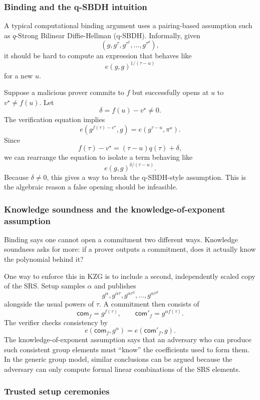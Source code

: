 \documentclass[11pt]{article}
\begin{document}
\subsubsection{Binding and the q-SBDH intuition}

A typical computational binding argument uses a pairing-based assumption such as $q$-Strong Bilinear Diffie-Hellman (q-SBDH). Informally, given
\[
    (g,g^\tau,g^{\tau^2},\ldots,g^{\tau^d}),
\]
it should be hard to compute an expression that behaves like
\[
    e(g,g)^{1/(\tau-u)}
\]
for a new $u$.

Suppose a malicious prover commits to $f$ but successfully opens at $u$ to $v^\star\neq f(u)$. Let
\[
    \delta=f(u)-v^\star\neq 0.
\]
The verification equation implies
\[
    e(g^{f(\tau)-v^\star},g)=e(g^{\tau-u},\pi^\star).
\]
Since
\[
    f(\tau)-v^\star=(\tau-u)q(\tau)+\delta,
\]
we can rearrange the equation to isolate a term behaving like
\[
    e(g,g)^{\delta/(\tau-u)}.
\]
Because $\delta\neq 0$, this gives a way to break the q-SBDH-style assumption. This is the algebraic reason a false opening should be infeasible.

\subsubsection{Knowledge soundness and the knowledge-of-exponent assumption}

Binding says one cannot open a commitment two different ways. Knowledge soundness asks for more: if a prover outputs a commitment, does it actually know the polynomial behind it?

One way to enforce this in KZG is to include a second, independently scaled copy of the SRS. Setup samples $\alpha$ and publishes
\[
    g^\alpha,g^{\alpha\tau},g^{\alpha\tau^2},\ldots,g^{\alpha\tau^d}
\]
alongside the usual powers of $\tau$. A commitment then consists of
\[
    \mathsf{com}_f=g^{f(\tau)},
    \qquad
    \mathsf{com}'_f=g^{\alpha f(\tau)}.
\]
The verifier checks consistency by
\[
    e(\mathsf{com}_f,g^\alpha)=e(\mathsf{com}'_f,g).
\]
The knowledge-of-exponent assumption says that an adversary who can produce such consistent group elements must ``know'' the coefficients used to form them. In the generic group model, similar conclusions can be argued because the adversary can only compute formal linear combinations of the SRS elements.

\subsubsection{Trusted setup ceremonies}
\end{document}
